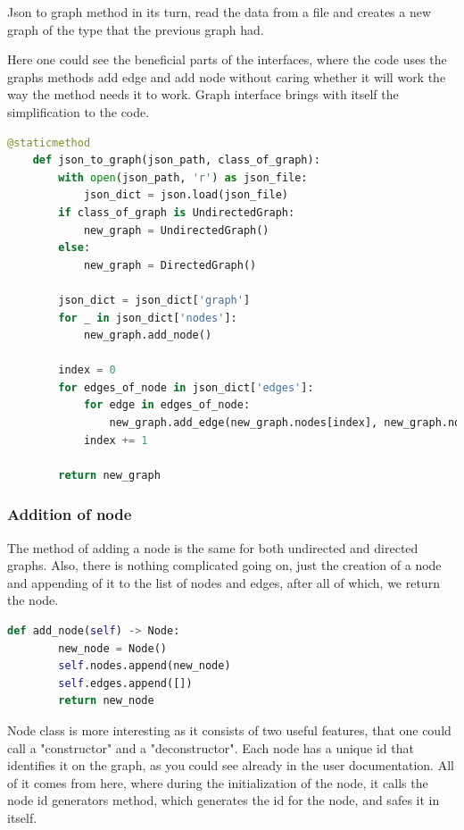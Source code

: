 Json to graph method in its turn, read the data from a file and creates a new graph of the type that the previous graph had. 

Here one could see the beneficial parts of the interfaces, where the code uses the graphs methods add edge and add node without caring whether it will work the way the method needs it to work. Graph interface brings with itself the simplification to the code.

\begin{lstlisting}[language={python}]
	@staticmethod
	def json_to_graph(json_path, class_of_graph):
		with open(json_path, 'r') as json_file:
			json_dict = json.load(json_file)
		if class_of_graph is UndirectedGraph:
			new_graph = UndirectedGraph()
		else:
			new_graph = DirectedGraph()
		
		json_dict = json_dict['graph']
		for _ in json_dict['nodes']:
			new_graph.add_node()
		
		index = 0
		for edges_of_node in json_dict['edges']:
			for edge in edges_of_node:
				new_graph.add_edge(new_graph.nodes[index], new_graph.nodes[edge[0]], edge[1])
			index += 1
		
		return new_graph
\end{lstlisting}

\subsubsection{Addition of node}

The method of adding a node is the same for both undirected and directed graphs. Also, there is nothing complicated going on, just the creation of a node and appending of it to the list of nodes and edges, after all of which, we return the node.

\begin{lstlisting}[language={python}]
 	def add_node(self) -> Node:
		new_node = Node()
		self.nodes.append(new_node)
		self.edges.append([])
		return new_node
\end{lstlisting}

Node class is more interesting as it consists of two useful features, that one could call a "constructor" and a "deconstructor". Each node has a unique id that identifies it on the graph, as you could see already in the user documentation. All of it comes from here, where during the initialization of the node, it calls the node id generators method, which generates the id for the node, and safes it in itself. 

